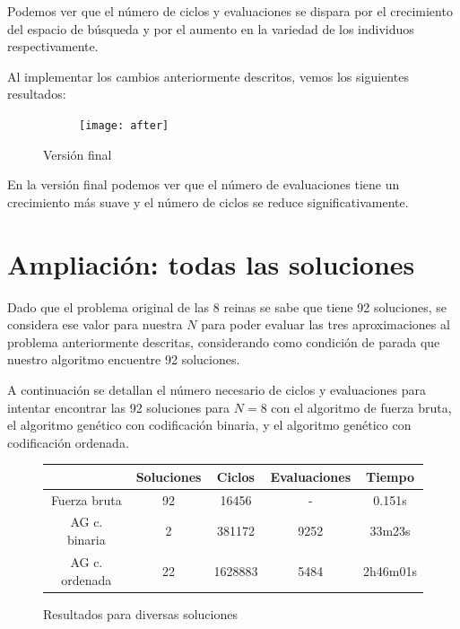 \documentclass[12pt]{article}
\begin{document}
Podemos ver que el número de ciclos y evaluaciones se dispara por el crecimiento del espacio de búsqueda y por el aumento en la variedad de los individuos respectivamente.

Al implementar los cambios anteriormente descritos, vemos los siguientes resultados:

\begin{figure}[h]
    \center
    \begin{subfigure}{.85\textwidth}
        \texttt{[image: after]}
    \end{subfigure}
    \caption{Versión final}
\end{figure}

En la versión final podemos ver que el número de evaluaciones tiene un crecimiento más suave y el número de ciclos se reduce significativamente.

\section{Ampliación: todas las soluciones}

Dado que el problema original de las 8 reinas se sabe que tiene 92 soluciones, se considera ese valor para nuestra $N$ para poder evaluar las tres aproximaciones al problema anteriormente descritas, considerando como condición de parada que nuestro algoritmo encuentre 92 soluciones.

A continuación se detallan el número necesario de ciclos y evaluaciones para intentar encontrar las 92 soluciones para $N=8$ con el algoritmo de fuerza bruta, el algoritmo genético con codificación binaria, y el algoritmo genético con codificación ordenada.

\begin{figure}[h]
    \center
    {
    \begin{tabular}{|c c c c c|}
        \hline
        \rowcolor{gray!10} & Soluciones & Ciclos & Evaluaciones & Tiempo \\
        \hline
        Fuerza bruta & 92 & 16456 & - & 0.151s\\ 
        \hline
        AG c. binaria & 2 & 381172 & 9252 & 33m23s\\
        \hline
        AG c. ordenada & 22 & 1628883 & 5484 & 2h46m01s\\
        \hline
    \end{tabular}
    }
    \caption{Resultados para diversas soluciones}
\end{figure}
\end{document}
